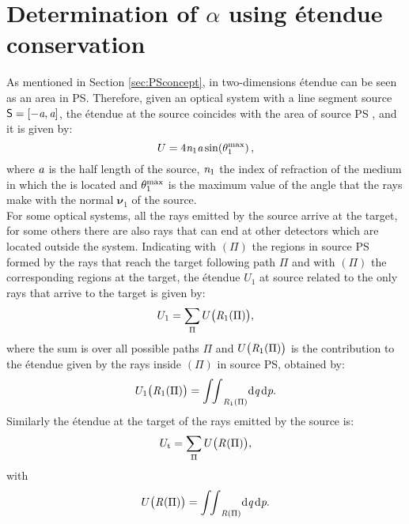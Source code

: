 \section{Determination of $\alpha$ using \'{e}tendue conservation} \label{sec:Tir_alpha}
As mentioned in Section \ref{sec:PSconcept}, in two-dimensions \'{e}tendue can be seen as an area in PS. 
Therefore, given an optical system with a line segment source $\textsf{S} = [-\textit{a}, \textit{a}]$, the \'{e}tendue at the source coincides with the area of source PS , and it is given by:
\begin{equation}\label{eq:etenduesource1}
U = 4\textit{n}_1 \textit{a} \sin(\theta_1^{\textrm{max}})\,,
\end{equation}
 where $\textit{a}$ is the half length of the source, $\textit{n}_1$ the index of refraction of the medium in which the  is located and $\theta_1^{\textrm{max}}$ is the maximum value of the angle that the rays make with the normal $\boldsymbol{\nu}_1$ of the source.\\ \indent 
For some optical systems, all the rays emitted by the source arrive at the target, for some others there are also rays that can end at other detectors which are located outside the system. 
Indicating with $(\Pi)$ the regions in source PS formed by the rays that reach the target following path $\Pi$ and with $(\Pi)$ the corresponding regions at the target, the \'{e}tendue $U_1$ at source related to the only rays that arrive to the target is given by:
\begin{equation}\label{eq:etenduesumsource}
U_1 = \sum_\Pi{U\big(\mbox{$\emph{R}_{\textit{$1$}}$}(\Pi)\big)},
\end{equation}
where the sum is over all possible paths $\Pi$ and $U\big(\mbox{$\emph{R}_{\textit{$1$}}$}(\Pi)\big)$ is the contribution to the \'{e}tendue given by the rays inside 
$(\Pi)$ in source PS, obtained by:
\begin{equation}\label{eq:etendueintegralsource}
U_1\big(\mbox{$\emph{R}_{\textit{$1$}}$}(\Pi)\big) = {\int\!\!\int}_{\emph{R}_1(\Pi)} \textrm{d}\textit{q}\,\textrm{d}\textit{p}.
\end{equation}
Similarly the \'{e}tendue at the target of the rays emitted by the source is:
\begin{equation}
U_\textrm{t}= \sum_\Pi{U\big(\mbox{$\emph{R}_{\textit{}}$}(\Pi)\big)},
\end{equation}
with
\begin{equation}\label{eq:etendueintegraltarget}
U\big(\mbox{$\emph{R}_{\textit{}}$}(\Pi)\big) = {\int\!\!\int}_{\emph{R}(\Pi)} \textrm{d}\textit{q}\,\textrm{d}\textit{p}.
\end{equation}
